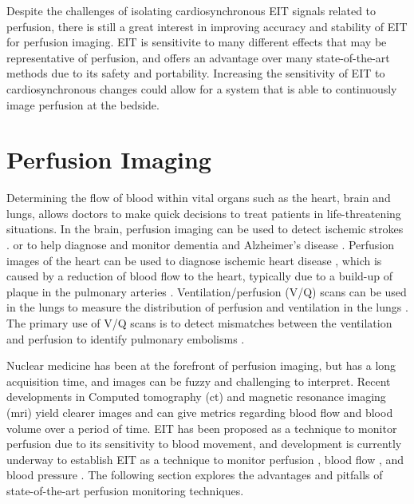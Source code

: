 Despite the challenges of isolating cardiosynchronous EIT signals related to 
perfusion, there is still a great interest in 
improving accuracy and stability of EIT for perfusion imaging.
EIT is sensitivite to many different effects that may be representative of 
perfusion, and offers an advantage over many  
state-of-the-art methods due to its safety and portability. 
Increasing the sensitivity of EIT to cardiosynchronous changes could
allow for a system that is able to 
continuously image perfusion at the bedside.

\section{Perfusion Imaging}

Determining the flow of blood within vital organs such as the heart, brain and lungs, 
allows doctors to make quick decisions to treat patients in life-threatening situations.
In the brain, perfusion imaging can be used to 
detect ischemic strokes 
\parencite{koenig_perfusion_1998,konstas_theoretic_2009}. 
or to help 
diagnose and monitor dementia
and Alzheimer's disease \parencite{dougall_systematic_2004,barker_pathophysiology_2014}.
Perfusion images of the heart can be used to diagnose ischemic 
heart disease \parencite{prvulovich_role_1998}, which is caused by a reduction 
of blood flow to the heart, typically due to 
a build-up of plaque in the pulmonary arteries
\parencite{mendis_global_2011}. Ventilation/perfusion (V/Q) scans can be used in the 
lungs to measure the distribution of perfusion and ventilation in the lungs 
\parencite{mortensen_lung_2019}. The primary use of V/Q scans
is to detect mismatches between the ventilation and perfusion to identify pulmonary 
embolisms \parencite{pioped-investigators_value_1990}.   

Nuclear medicine has been at the forefront of perfusion imaging, but has a long
acquisition time, and images can be fuzzy and 
challenging to interpret. 
Recent developments in Computed tomography (\acrshort{ct}) and magnetic resonance imaging (\acrshort{mri})
yield clearer images and can give metrics 
regarding blood flow and blood volume over a period of 
time. 
EIT has been proposed as a technique to monitor perfusion due 
to its sensitivity to blood movement, 
and development is currently underway to 
establish EIT as a technique to monitor 
perfusion \parencite{nguyen_review_2012,nguyen_perfusion_2015}, 
blood flow \parencite{braun_limitations_2018,braun_accuracy_2018}, and 
blood pressure \parencite{proenca_noninvasive_2017,proenca_non-invasive_2020}. 
The following section 
explores the advantages and pitfalls of state-of-the-art perfusion monitoring techniques. 


